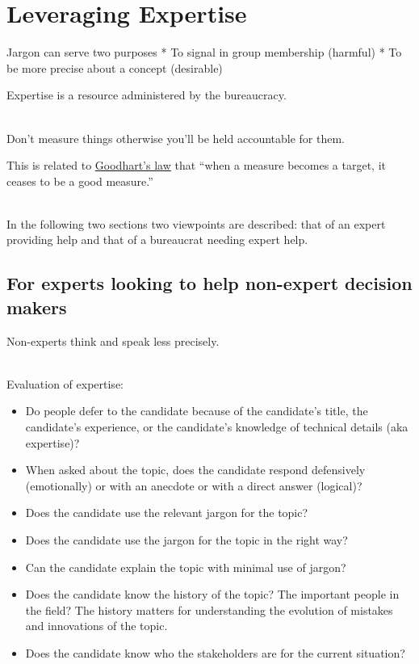 \section{Leveraging Expertise\label{sec:expertise}}

Jargon can serve two purposes
* To signal in group membership (harmful)
* To be more precise about a concept (desirable)


Expertise is a resource administered by the bureaucracy.

\ \\

Don't measure things otherwise you'll be held accountable for them.

This is related to \href{https://en.wikipedia.org/wiki/Goodhart\%27s_law}{Goodhart's law} that ``when a measure becomes a target, it ceases to be a good measure.''

\ \\

In the following two sections two viewpoints are described: that of an expert providing help and that of a bureaucrat needing expert help. 

\subsection*{For experts looking to help non-expert decision makers}

Non-experts think and speak less precisely.

\ \\

Evaluation of expertise:
\begin{itemize}
    \item Do people defer to the candidate because of the candidate's title, the candidate's experience, or the candidate's knowledge of technical details (aka expertise)?
    \item When asked about the topic, does the candidate respond defensively (emotionally) or with an anecdote or with a direct answer (logical)?
    \item Does the candidate use the relevant jargon for the topic?
    \item Does the candidate use the jargon for the topic in the right way?
    \item Can the candidate explain the topic with minimal use of jargon?
    \item Does the candidate know the history of the topic? The important people in the field? The history matters for understanding the evolution of mistakes and innovations of the topic.
    \item Does the candidate know who the stakeholders are for the current situation? 
\end{itemize}



